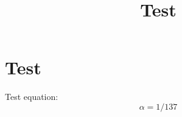 \documentclass{article}
\begin{document}
\title{Test}
\maketitle
\section{Test}
Test equation:
\begin{equation}
\alpha = 1/137
\end{equation}
\end{document}
